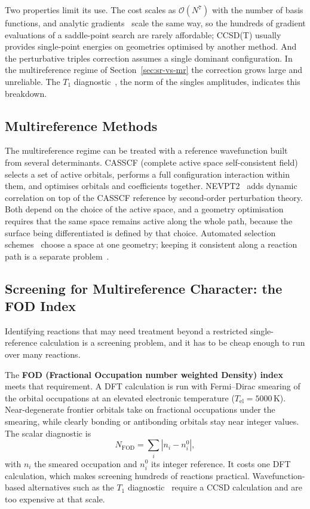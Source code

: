Two properties limit its use. The cost scales as $\mathcal{O}(N^7)$ with the
number of basis functions, and analytic gradients~\cite{scuseria1991} scale
the same way, so the hundreds of gradient evaluations of a saddle-point search
are rarely affordable; \mbox{CCSD(T)} usually provides single-point energies
on geometries optimised by another method. And the perturbative triples
correction assumes a single dominant configuration. In the multireference
regime of Section~\ref{sec:sr-vs-mr} the correction grows large and
unreliable. The $T_1$ diagnostic~\cite{lee1989}, the norm of the singles
amplitudes, indicates this breakdown.

\subsection{Multireference Methods}
\label{sec:background-mr}

The multireference regime can be treated with a reference wavefunction built
from several determinants. CASSCF (complete active space self-consistent
field) selects a set of active orbitals, performs a full configuration
interaction within them, and optimises orbitals and coefficients together.
NEVPT2~\cite{angeli2001} adds dynamic correlation on top of the CASSCF
reference by second-order perturbation theory. Both depend on the choice of
the active space, and a geometry optimisation requires that the same space
remains active along the whole path, because the surface being differentiated
is defined by that choice. Automated selection schemes~\cite{sayfutyarova2017,
stein2019autocas} choose a space at one geometry; keeping it consistent along a
reaction path is a separate problem~\cite{bensberg2023, seal2025wasp}.

\subsection{Screening for Multireference Character: the FOD Index}
\label{sec:background-mr-diagnostics}

Identifying reactions that may need treatment beyond a restricted single-reference
calculation is a screening problem, and it has to be cheap enough to run over
many reactions.

The \textbf{FOD (Fractional Occupation number weighted Density)
index}~\cite{grimme2015} meets that requirement. A DFT calculation is run with
Fermi--Dirac smearing of the orbital occupations at an elevated electronic
temperature ($T_\text{el} = 5000$\,K). Near-degenerate frontier orbitals take on
fractional occupations under the smearing, while clearly bonding or antibonding
orbitals stay near integer values. The scalar diagnostic is
%
\begin{equation}
  N_\text{FOD} = \sum_i |n_i - n_i^0| ,
\end{equation}
%
with $n_i$ the smeared occupation and $n_i^0$ its integer reference. It costs one
DFT calculation, which makes screening hundreds of reactions practical.
Wavefunction-based alternatives such as the $T_1$ diagnostic~\cite{lee1989}
require a CCSD calculation and are too expensive at that scale.

